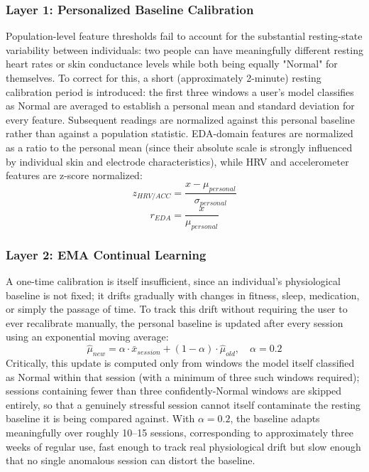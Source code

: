 \documentclass[conference]{IEEEtran}
\begin{document}
\subsubsection{Layer 1: Personalized Baseline
Calibration}
Population-level feature thresholds fail to account for the
substantial resting-state variability between individuals:
two people can have meaningfully different resting heart
rates or skin conductance levels while both being equally
"Normal" for themselves. To correct for this, a short
(approximately 2-minute) resting calibration period is
introduced: the first three windows a user's model classifies
as Normal are averaged to establish a personal mean and
standard deviation for every feature. Subsequent readings are
normalized against this personal baseline rather than against
a population statistic. EDA-domain features are normalized as
a ratio to the personal mean (since their absolute scale is
strongly influenced by individual skin and electrode
characteristics), while HRV and accelerometer features are
z-score normalized:
\begin{equation}
z_{HRV/ACC} = \frac{x - \mu_{personal}}
{\sigma_{personal}}
\label{eq_zscore}
\end{equation}
\begin{equation}
r_{EDA} = \frac{x}{\mu_{personal}}
\label{eq_ratio}
\end{equation}

\subsubsection{Layer 2: EMA Continual Learning}
A one-time calibration is itself insufficient, since an
individual's physiological baseline is not fixed; it drifts
gradually with changes in fitness, sleep, medication, or
simply the passage of time. To track this drift without
requiring the user to ever recalibrate manually, the personal
baseline is updated after every session using an exponential
moving average:
\begin{equation}
\hat{\mu}_{new} = \alpha \cdot
\bar{x}_{session} +
(1-\alpha) \cdot \hat{\mu}_{old},
\quad \alpha = 0.2
\label{eq_ema}
\end{equation}
Critically, this update is computed only from windows the
model itself classified as Normal within that session (with a
minimum of three such windows required); sessions containing
fewer than three confidently-Normal windows are skipped
entirely, so that a genuinely stressful session cannot itself
contaminate the resting baseline it is being compared against.
With $\alpha = 0.2$, the baseline adapts meaningfully over
roughly 10–15 sessions, corresponding to approximately three
weeks of regular use, fast enough to track real physiological
drift but slow enough that no single anomalous session can
distort the baseline.
\end{document}
